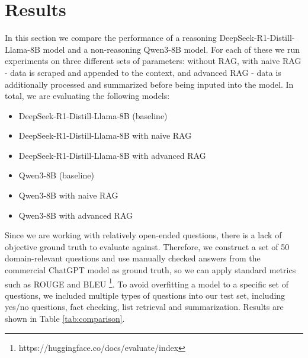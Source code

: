 \documentclass[fleqn,moreauthors,10pt]{ds_report}
\begin{document}

\section*{Results}

In this section we compare the performance of a reasoning DeepSeek-R1-Distill-Llama-8B \cite{deepseek3} model and a non-reasoning Qwen3-8B \cite{qwen3} model. For each of these we run experiments on three different sets of parameters: without RAG, with naive RAG - data is scraped and appended to the context, and advanced RAG - data is additionally processed and summarized before being inputed into the model. In total, we are evaluating the following models:
\begin{itemize}
	\item DeepSeek-R1-Distill-Llama-8B (baseline)
	\item DeepSeek-R1-Distill-Llama-8B with naive RAG
	\item DeepSeek-R1-Distill-Llama-8B with advanced RAG
	\item Qwen3-8B (baseline)
	\item Qwen3-8B with naive RAG
	\item Qwen3-8B with advanced RAG
\end{itemize}

Since we are working with relatively open-ended questions, there is a lack of objective ground truth to evaluate against. Therefore, we construct a set of 50 domain-relevant questions and use manually checked answers from the commercial ChatGPT model as ground truth, so we can apply standard metrics such as ROUGE and BLEU \footnote{https://huggingface.co/docs/evaluate/index}. To avoid overfitting a model to a specific set of questions, we included multiple types of questions into our test set, including yes/no questions, fact checking, list retrieval and summarization. Results are shown in Table \ref{tab:comparison}.

\begin{table}[!htb]
\centering
{}
\caption{Performance comparison against ChatGPT-generated ground truth.}
\label{tab:comparison}
\end{table}
\end{document}
